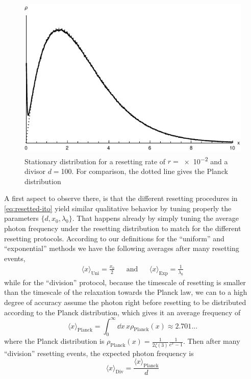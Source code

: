 \documentclass[a4paper,12pt,reqno,superscriptaddress,nofootinbib]{revtex4}
\theoremstyle{plain}
\theoremstyle{definition}
\theoremstyle{remark}
\newcommand{\0}{^{(0)}}
\newcommand{\1}{^{(1)}}
\newcommand{\2}{^{(2)}}
\begin{document}
\begin{figure}
	\includegraphics{fullplanck.pdf}
	\caption{Stationary distribution for a resetting rate of $r=$\num{e-2} and a divisor $d=$\num{100}. For comparison, the dotted line gives the Planck distribution}\label{fig:fullplanck}
\end{figure}

A first aspect to observe there, is that the different resetting procedures in \eqref{eq:resetted-ito} yield similar qualitative behavior by tuning properly the parameters $\{d,x_0,\lambda_0\}$.  That happens already by simply tuning the average photon frequency under the resetting distribution to match for the different resetting protocols. According to our definitions for the ``uniform'' and ``exponential'' methods we have the following averages after many resetting events,
\begin{align*}\langle x \rangle_{\text{Uni}} = \frac{x_0}{2} &&\text{and}&& \langle x \rangle_\text{Exp} = \frac{1}{\lambda_0}\end{align*}
while for the ``division'' protocol, because the timescale of resetting is smaller than the timescale of the relaxation towards the Planck law, we can to a high degree of accuracy assume the photon right before resetting to be distributed according to the Planck distribution, which gives it an average frequency of
\[\langle x \rangle_\text{Planck} = \int_0^{\infty}\dd x\,  x\rho_\text{Planck}(x) \approx 2.701...\]
where the Planck distribution is $\rho_\text{Planck}(x) = \frac{1}{2\zeta(3)}\frac{1}{e^{x}-1}$. Then after many ``division'' resetting events, the expected photon frequency is
\[\langle x\rangle_{\text{Div}}=\frac{\langle x \rangle_\text{Planck}}{d} \]
\end{document}
